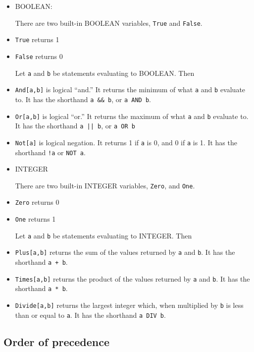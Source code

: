 \begin{itemize}
\item
BOOLEAN:

There are two built-in BOOLEAN variables, \verb+True+  and \verb+False+.  

\bd
\item
\verb+True+ returns 1

\item
\verb+False+ returns 0
\ed

Let \verb+a+ and \verb+b+ be statements evaluating to BOOLEAN. Then  

\bd
\item
\verb+And[a,b]+ is logical ``and.''  It returns the minimum of what
\verb+a+ and \verb+b+ evaluate to.  It has the shorthand \verb+a && b+, or
\verb+a AND b+. 

\item
\verb+Or[a,b]+ is logical ``or.''  It returns the maximum of what
\verb+a+ and \verb+b+ evaluate to.  It has the shorthand \verb+a || b+, 
or \verb+a OR b+

\item
\verb+Not[a]+ is logical negation.  It returns 1 if \verb+a+ is 0, and
0 if \verb+a+ is 1.  It has the shorthand \verb+!a+ or \verb+NOT a+.  
\ed

\item
INTEGER

There are two built-in INTEGER variables, \verb+Zero+, and \verb+One+.

\bd
\item
\verb+Zero+ returns 0

\item
\verb+One+ returns 1
\ed

Let \verb+a+ and \verb+b+ be statements evaluating to INTEGER. Then

\bd
\item
\verb+Plus[a,b]+ returns the sum of the values returned by
\verb+a+ and \verb+b+.  It has the shorthand \verb&a + b&.
 
\item
\verb+Times[a,b]+ returns the product of the values returned by
\verb+a+ and \verb+b+.  It has the shorthand \verb+a * b+.

\item
\verb+Divide[a,b]+ returns the largest integer which, when
multiplied by \verb+b+ is less than or equal to \verb+a+.  It has
the shorthand \verb+a DIV b+.
\ed
\end{itemize}

\subsection{Order of precedence}

